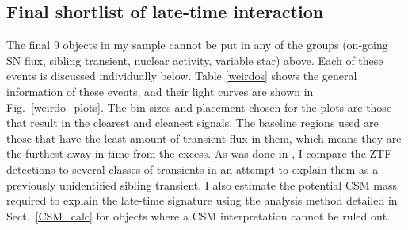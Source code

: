 \documentclass[a4paper,oneside,12pt, class=Latex/Classes/PhDthesisPSnPDF, crop=false]{standalone}
\begin{document}
\subsection{Final shortlist of late-time interaction}
\label{weirdo_section}
The final 9 objects in my sample cannot be put in any of the groups (on-going SN flux, sibling transient, nuclear activity, variable star) above. Each of these events is discussed individually below. Table \ref{weirdos} shows the general information of these events, and their light curves are shown in Fig.~\ref{weirdo_plots}. The bin sizes and placement chosen for the plots are those that result in the clearest and cleanest signals. The baseline regions used are those that have the least amount of transient flux in them, which means they are the furthest away in time from the excess. As was done in \citet{Terwel_2024_paper1}, I compare the ZTF detections to several classes of transients in an attempt to explain them as a previously unidentified sibling transient. I also estimate the potential CSM mass required to explain the late-time signature using the analysis method detailed in Sect.~\ref{CSM_calc} for objects where a CSM interpretation cannot be ruled out.\\
\end{document}
